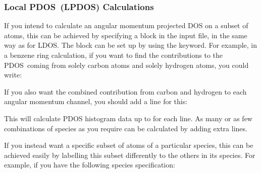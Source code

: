 \documentclass[letterpaper,10pt,english]{sphinxmanual}
\begin{document}
\subsubsection{Local PDOS (LPDOS) Calculations}
\label{\detokenize{ldos_calculations:local-pdos-lpdos-calculations}}
If you intend to calculate an angular momentum projected DOS on a subset
of atoms, this can be achieved by specifying a block in the input file,
in the same way as for LDOS. The block can be set up by using the
 keyword. For example, in a benzene ring
calculation, if you want to find the contributions to the PDOS coming
from solely carbon atoms and solely hydrogen atoms, you could write:

%
\begin{sphinxVerbatim}[commandchars=\\\{\}]
 
 
\end{sphinxVerbatim}

If you also want the combined contribution from carbon and hydrogen to
each angular momentum channel, you should add a line for this:

%
\begin{sphinxVerbatim}[commandchars=\\\{\}]
 
   
 
\end{sphinxVerbatim}

This will calculate PDOS histogram data up to  for each
line. As many or as few combinations of species as you require can be
calculated by adding extra lines.

If you instead want a specific subset of atoms of a particular species,
this can be achieved easily by labelling this subset differently to the
others in its species. For example, if you have the following species
specification:
\end{document}
